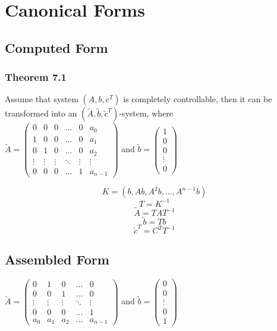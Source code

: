 \documentclass[12pt]{article}
\begin{document}
\section*{Canonical Forms}
\subsection*{Computed Form}
\subsubsection*{Theorem 7.1}
Assume that system $(A, b, c^T)$ is completely controllable, then it can be transformed into an $(\tilde{A}, \tilde{b}, \tilde{c}^T)$-system, where \\
$\tilde{A}=
\begin{pmatrix}
	0 & 0 & 0 & \dots & 0 & a_0 \\
	1 & 0 & 0 & \dots & 0 & a_1 \\
	0 & 1 & 0 & \dots & 0 & a_2 \\
	\vdots & \vdots & \vdots & \ddots & \vdots & \vdots \\
	0 & 0 & 0 & \dots & 1 & a_{n-1} 
\end{pmatrix}$ and 
$\tilde{b}=\begin{pmatrix}
1\\
0\\
0\\
\vdots\\
0
\end{pmatrix}$

$$K=(b,Ab,A^2b,\dots,A^{n-1}b)$$
$$T = K^{-1}$$
$$\tilde{A}=TAT^{-1}$$
$$\tilde{b}=Tb$$
$$\tilde{c}^T=C^TT^{-1}$$

\subsection*{Assembled Form}
$\tilde{A}=
\begin{pmatrix}
	0 & 1 & 0 & \dots & 0 \\
	0 & 0 & 1 & \dots & 0 \\
	\vdots & \vdots & \vdots & \ddots & \vdots \\
	0 & 0 & 0 & \dots & 1 \\
	a_0 & a_1 & a_2 & \dots & a_{n-1} 
\end{pmatrix}$ and 
$\tilde{b}=\begin{pmatrix}
0\\
0\\
\vdots\\
0\\
1
\end{pmatrix}$
\end{document}
